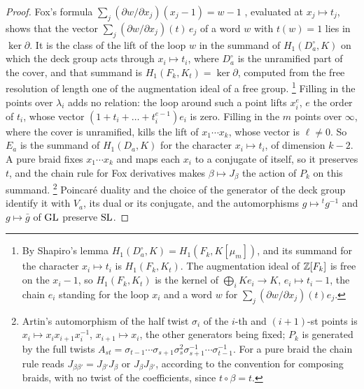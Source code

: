 \begin{proof}
Fox's formula $\sum_{j}(\partial w/\partial x_{j})(x_{j}-1)=w-1$ \cite{Fox53},
evaluated at $x_{j}\mapsto t_{j}$, shows that the vector
$\sum_{j}(\partial w/\partial x_{j})(t)\,e_{j}$ of a word $w$ with $t(w)=1$ lies
in $\ker\partial$. It is the class of the lift of the loop $w$ in the summand
of $H_{1}(D_{a}^{\circ},K)$ on which the deck group acts through
$x_{i}\mapsto t_{i}$, where $D_{a}^{\circ}$ is the unramified part of the
cover, and that summand is $H_{1}(F_{k},K_{t})=\ker\partial$, computed from the
free resolution of length one of the augmentation ideal of a free group.%
\footnote{By Shapiro's lemma $H_{1}(D_{a}^{\circ},K)=H_{1}(F_{k},K[\mu_{m}])$,
and its summand for the character $x_{i}\mapsto t_{i}$ is $H_{1}(F_{k},K_{t})$.
The augmentation ideal of $\mathbb{Z}[F_{k}]$ is free on the $x_{i}-1$, so
$H_{1}(F_{k},K_{t})$ is the kernel of $\bigoplus_{i}Ke_{i}\to K$,
$e_{i}\mapsto t_{i}-1$, the chain $e_{i}$ standing for the loop $x_{i}$ and a word
$w$ for $\sum_{j}(\partial w/\partial x_{j})(t)e_{j}$.} Filling in the points
over $\lambda_{i}$ adds no relation: the loop around such a point lifts
$x_{i}^{e}$, $e$ the order of $t_{i}$, whose vector
$(1+t_{i}+\dots+t_{i}^{e-1})e_{i}$ is zero. Filling in the $m$ points over
$\infty$, where the cover is unramified, kills the lift of $x_{1}\cdots
x_{k}$, whose vector is $\ell\ne0$. So $E_{a}$ is the summand of
$H_{1}(D_{a},K)$ for the character $x_{i}\mapsto t_{i}$, of dimension $k-2$. A
pure braid fixes $x_{1}\cdots x_{k}$ and maps each $x_{i}$ to a conjugate of
itself, so it preserves $t$, and the chain rule for Fox derivatives makes
$\beta\mapsto J_{\beta}$ the action of $P_{k}$ on this summand.%
\footnote{Artin's automorphism of the half twist $\sigma_{i}$ of the $i$-th
and $(i+1)$-st points is $x_{i}\mapsto x_{i}x_{i+1}x_{i}^{-1}$,
$x_{i+1}\mapsto x_{i}$, the other generators being fixed; $P_{k}$ is generated
by the full twists $A_{st}=\sigma_{t-1}\cdots\sigma_{s+1}\sigma_{s}^{2}
\sigma_{s+1}^{-1}\cdots\sigma_{t-1}^{-1}$. For a pure braid the chain rule
reads $J_{\beta\beta'}=J_{\beta'}J_{\beta}$ or $J_{\beta}J_{\beta'}$, according
to the convention for composing braids, with no twist of the coefficients,
since $t\circ\beta=t$.} Poincar\'e duality and the choice of the generator
of the deck group identify it with $V_{a}$, its dual or its conjugate, and
the automorphisms $g\mapsto{}^{t}g^{-1}$ and $g\mapsto\bar g$ of $\operatorname{GL}$ preserve
$\operatorname{SL}$.
\end{proof}

